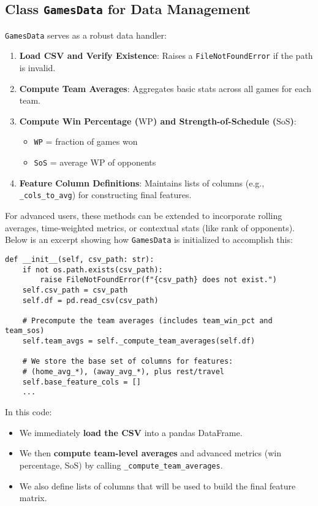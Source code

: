 \documentclass[12pt]{article}
\begin{document}
\subsection{Class \texttt{GamesData} for Data Management}
\texttt{GamesData} serves as a robust data handler:
\begin{enumerate}[label=\arabic*)]
    \item \textbf{Load CSV and Verify Existence}: Raises a \texttt{FileNotFoundError} if the path is invalid.
    \item \textbf{Compute Team Averages}: Aggregates basic stats across all games for each team.
    \item \textbf{Compute Win Percentage (\(\text{WP}\)) and Strength-of-Schedule (\(\text{SoS}\))}: 
        \begin{itemize}[noitemsep]
            \item \texttt{WP} = fraction of games won
            \item \texttt{SoS} = average WP of opponents
        \end{itemize}
    \item \textbf{Feature Column Definitions}: Maintains lists of columns (e.g., \texttt{\_cols\_to\_avg}) for constructing final features.
\end{enumerate}

For advanced users, these methods can be extended to incorporate rolling averages, time-weighted metrics, or contextual stats (like rank of opponents). Below is an excerpt showing how \texttt{GamesData} is initialized to accomplish this:

\begin{verbatim}
def __init__(self, csv_path: str):
    if not os.path.exists(csv_path):
        raise FileNotFoundError(f"{csv_path} does not exist.")
    self.csv_path = csv_path
    self.df = pd.read_csv(csv_path)

    # Precompute the team averages (includes team_win_pct and team_sos)
    self.team_avgs = self._compute_team_averages(self.df)

    # We store the base set of columns for features:
    # (home_avg_*), (away_avg_*), plus rest/travel
    self.base_feature_cols = []
    ...
\end{verbatim}

\noindent
In this code:
\begin{itemize}
    \item We immediately \textbf{load the CSV} into a pandas DataFrame.
    \item We then \textbf{compute team-level averages} and advanced metrics (win percentage, SoS) by calling \texttt{\_compute\_team\_averages}.
    \item We also define lists of columns that will be used to build the final feature matrix.
\end{itemize}
\end{document}
